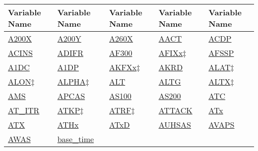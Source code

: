 \documentclass[
  english,
]{book}
\begin{document}
\begin{longtable}[]{@{}lllll@{}}
\toprule
Variable Name & Variable Name & Variable Name & Variable Name & Variable
Name \\
\midrule
\endhead
\href{./cloud-physics-variables.html\#CRPC}{A200X} &
\href{./cloud-physics-variables.html\#CRPC}{A200Y} &
\href{./cloud-physics-variables.html\#CRPC}{A260X} &
\href{./obsolete-variables.html\#AACT}{AACT} &
\href{./cloud-physics-variables.html\#CRPC}{ACDP} \\
\href{./the-state-of-the-aircraft.html\#ACINS}{ACINS} &
\href{./the-state-of-the-atmosphere.html\#adifr}{ADIFR} &
\href{./cloud-physics-variables.html\#CRPC}{AF300} &
\href{./obsolete-variables.html\#vanes}{AFIXx\(\ddagger\)} &
\href{./cloud-physics-variables.html\#CRPC}{AFSSP} \\
\href{./cloud-physics-variables.html\#a1dc-a1dp}{A1DC} &
\href{./cloud-physics-variables.html\#a1dc-a1dp}{A1DP} &
\href{./obsolete-variables.html\#akfxx}{AKFXx\(\ddagger\)} &
\href{./the-state-of-the-atmosphere.html\#akrd}{AKRD} &
\href{./obsolete-variables.html\#ltn51}{ALAT\(\ddagger\)} \\
\href{./obsolete-variables.html\#ltn51}{ALON\(\ddagger\)} &
\href{./obsolete-variables.html\#ltn51}{ALPHA\(\ddagger\)} &
\href{./the-state-of-the-aircraft.html\#alt}{ALT} &
\href{./the-state-of-the-aircraft.html\#altg}{ALTG} &
\href{./the-state-of-the-aircraft.html\#altx}{ALTX\(\ddagger\)} \\
\href{./aerosol-particle-measurements.html\#special-aerosol}{AMS} &
\href{./cloud-physics-variables.html\#CRPC}{APCAS} &
\href{./cloud-physics-variables.html\#CRPC}{AS100} &
\href{./cloud-physics-variables.html\#CRPC}{AS200} &
\href{./obsolete-variables.html\#atc}{ATC} \\
\href{./the-state-of-the-atmosphere.html\#at-itr}{AT\_ITR} &
\href{./obsolete-variables.html\#atkp}{ATKP\(\ddagger\)} &
\href{./obsolete-variables.html\#atrf}{ATRF\(\ddagger\)} &
\href{./the-state-of-the-atmosphere.html\#attack}{ATTACK} &
\href{./the-state-of-the-atmosphere.html\#ambient-t}{ATx} \\
\href{./the-state-of-the-atmosphere.html\#ambient-t}{ATX} &
\href{./the-state-of-the-atmosphere.html\#ambient-t}{ATHx} &
\href{./the-state-of-the-atmosphere.html\#ambient-t}{ATxD} &
\href{./cloud-physics-variables.html\#CRPC}{AUHSAS} &
\href{./the-state-of-the-atmosphere.html\#special-use-remote}{AVAPS} \\
\href{./air-chemistry-measurements.html\#awas-cims-qcls-toga}{AWAS} &
\href{./general-information-about-data-files.html\#base-time}{base\_time}

\end{longtable}
\end{document}
